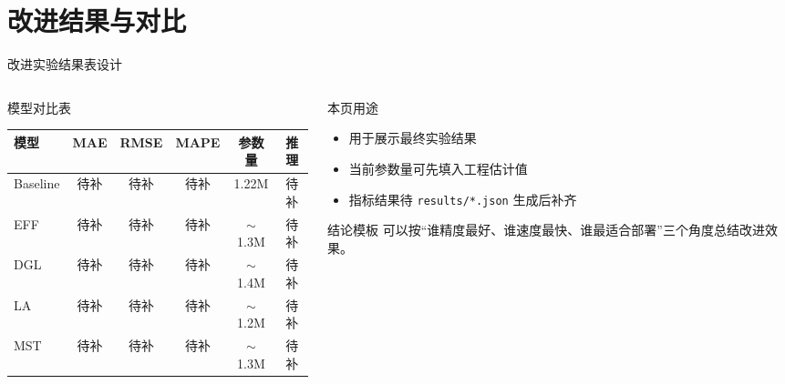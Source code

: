 \documentclass[10pt,aspectratio=169]{ctexbeamer}
\begin{document}
\section{改进结果与对比}

\begin{frame}{改进实验结果表设计}
  \begin{columns}[T]
    \begin{column}{0.58\textwidth}
      \begin{block}{模型对比表}
        \begin{table}
          \centering
          \scriptsize
          \renewcommand{\arraystretch}{1.15}
          \begin{tabular}{lccccc}
            \toprule
            \textbf{模型} & \textbf{MAE} & \textbf{RMSE} & \textbf{MAPE} & \textbf{参数量} & \textbf{推理} \\
            \midrule
            Baseline & 待补 & 待补 & 待补 & 1.22M & 待补 \\
            EFF & 待补 & 待补 & 待补 & $\sim$1.3M & 待补 \\
            DGL & 待补 & 待补 & 待补 & $\sim$1.4M & 待补 \\
            LA & 待补 & 待补 & 待补 & $\sim$1.2M & 待补 \\
            MST & 待补 & 待补 & 待补 & $\sim$1.3M & 待补 \\
            \bottomrule
          \end{tabular}
        \end{table}
      \end{block}
    \end{column}
    \begin{column}{0.38\textwidth}
      \begin{alertblock}{本页用途}
        \begin{itemize}\setlength{\itemsep}{2pt}
          \item 用于展示最终实验结果
          \item 当前参数量可先填入工程估计值
        \item 指标结果待 \texttt{results/*.json} 生成后补齐
        \end{itemize}
      \end{alertblock}

      \begin{exampleblock}{结论模板}
        可以按“谁精度最好、谁速度最快、谁最适合部署”三个角度总结改进效果。
      \end{exampleblock}
    \end{column}
  \end{columns}
\end{frame}
\end{document}
